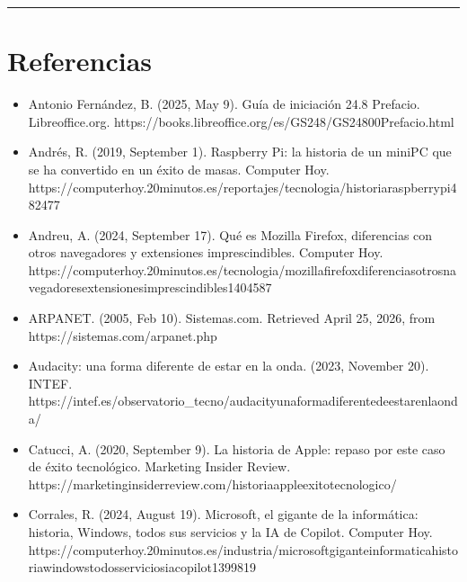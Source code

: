 \documentclass[letterpaper,10pt,spanish]{sphinxmanual}
\begin{document}
\bigskip\hrule\bigskip


\sphinxstepscope


\chapter{Referencias}
\label{\detokenize{referencias:referencias}}\label{\detokenize{referencias::doc}}\begin{itemize}
\item {} 
\sphinxAtStartPar
Antonio Fernández, B. (2025, May 9). Guía de iniciación 24.8 \sphinxhyphen{} Prefacio. Libreoffice.org. https://books.libreoffice.org/es/GS248/GS24800\sphinxhyphen{}Prefacio.html

\item {} 
\sphinxAtStartPar
Andrés, R. (2019, September 1). Raspberry Pi: la historia de un mini\sphinxhyphen{}PC que se ha convertido en un éxito de masas. Computer Hoy. https://computerhoy.20minutos.es/reportajes/tecnologia/historia\sphinxhyphen{}raspberry\sphinxhyphen{}pi\sphinxhyphen{}482477

\item {} 
\sphinxAtStartPar
Andreu, A. (2024, September 17). Qué es Mozilla Firefox, diferencias con otros navegadores y extensiones imprescindibles. Computer Hoy. https://computerhoy.20minutos.es/tecnologia/mozilla\sphinxhyphen{}firefox\sphinxhyphen{}diferencias\sphinxhyphen{}otros\sphinxhyphen{}navegadores\sphinxhyphen{}extensiones\sphinxhyphen{}imprescindibles\sphinxhyphen{}1404587

\item {} 
\sphinxAtStartPar
ARPANET. (2005, Feb 10). Sistemas.com. Retrieved April 25, 2026, from https://sistemas.com/arpanet.php

\item {} 
\sphinxAtStartPar
Audacity: una forma diferente de estar en la onda. (2023, November 20). INTEF. https://intef.es/observatorio\_tecno/audacity\sphinxhyphen{}una\sphinxhyphen{}forma\sphinxhyphen{}diferente\sphinxhyphen{}de\sphinxhyphen{}estar\sphinxhyphen{}en\sphinxhyphen{}la\sphinxhyphen{}onda/

\item {} 
\sphinxAtStartPar
Catucci, A. (2020, September 9). La historia de Apple: repaso por este caso de éxito tecnológico. Marketing Insider Review. https://marketinginsiderreview.com/historia\sphinxhyphen{}apple\sphinxhyphen{}exito\sphinxhyphen{}tecnologico/

\item {} 
\sphinxAtStartPar
Corrales, R. (2024, August 19). Microsoft, el gigante de la informática: historia, Windows, todos sus servicios y la IA de Copilot. Computer Hoy. https://computerhoy.20minutos.es/industria/microsoft\sphinxhyphen{}gigante\sphinxhyphen{}informatica\sphinxhyphen{}historia\sphinxhyphen{}windows\sphinxhyphen{}todos\sphinxhyphen{}servicios\sphinxhyphen{}ia\sphinxhyphen{}copilot\sphinxhyphen{}1399819


\end{itemize}
\end{document}
